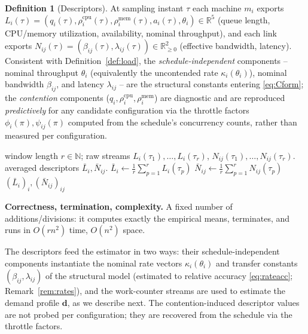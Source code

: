 \documentclass{amsart}
\theoremstyle{definition}
\newtheorem{definition}{Definition}
\begin{document}
\begin{definition}[Descriptors]\label{def:descriptors}
At sampling instant $\tau$ each machine $m_i$ exports
$L_i(\tau)=(q_i(\tau),\rho^{\mathrm{cpu}}_i(\tau),\rho^{\mathrm{mem}}_i(\tau),
a_i(\tau),\theta_i)\in\mathbb{R}^5$ (queue length, CPU/memory utilization,
availability, nominal throughput), and each link exports
$N_{ij}(\tau)=(\beta_{ij}(\tau),\lambda_{ij}(\tau))\in\mathbb{R}^2_{\ge0}$
(effective bandwidth, latency). Consistent with Definition~\ref{def:load}, the
\emph{schedule-independent} components -- nominal throughput $\theta_i$
(equivalently the uncontended rate $\kappa_i(\theta_i)$), nominal bandwidth
$\beta_{ij}$, and latency $\lambda_{ij}$ -- are the structural constants entering
\eqref{eq:Cform}; the \emph{contention} components ($q_i,\rho^{\mathrm{cpu}}_i,
\rho^{\mathrm{mem}}_i$) are diagnostic and are reproduced \emph{predictively} for
any candidate configuration via the throttle factors $\phi_i(\pi),\psi_{ij}(\pi)$
computed from the schedule's concurrency counts, rather than measured per
configuration.
\end{definition}

\begin{algorithm}[h]
\caption{ComputeDescriptors}\label{alg:descr}
\begin{algorithmic}[1]
\Require window length $r\in\mathbb N$; raw streams $L_i(\tau_1),\dots,L_i(\tau_r)$, $N_{ij}(\tau_1),\dots,N_{ij}(\tau_r)$.
\Ensure averaged descriptors $\bar L_i,\bar N_{ij}$.
  \State $\bar L_i\gets\frac1r\sum_{p=1}^r L_i(\tau_p)$
   \State $\bar N_{ij}\gets\frac1r\sum_{p=1}^r N_{ij}(\tau_p)$ \EndFor
\EndFor
\State \Return $(\bar L_i)_i,(\bar N_{ij})_{ij}$
\end{algorithmic}
\end{algorithm}

\noindent\textbf{Correctness, termination, complexity.} A fixed number of
additions/divisions: it computes exactly the empirical means, terminates, and
runs in $O(rn^2)$ time, $O(n^2)$ space.

The descriptors feed the estimator in two ways: their schedule-independent
components instantiate the nominal rate vectors $\kappa_i(\theta_i)$ and transfer
constants $(\beta_{ij},\lambda_{ij})$ of the structural model (estimated to
relative accuracy \eqref{eq:rateacc}; Remark~\ref{rem:rates}), and the
work-counter streams are used to estimate the demand profile $\mathbf d$, as we
describe next. The contention-induced descriptor values are not probed per
configuration; they are recovered from the schedule via the throttle factors.
\end{document}
